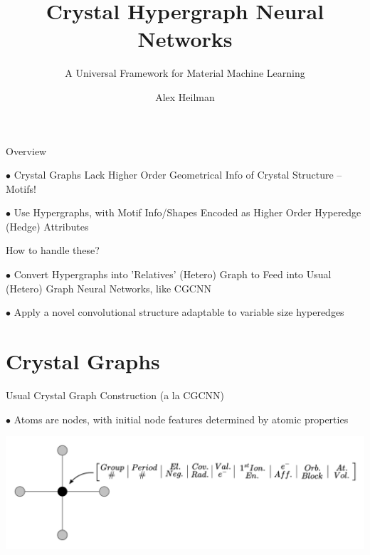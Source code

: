 \documentclass[11pt]{beamer}
\author{Alex Heilman}
\title{Crystal Hypergraph Neural Networks}
\subtitle{A Universal Framework for Material Machine Learning}
\begin{document}
\begin{frame}
\titlepage
\end{frame}


\begin{frame}{Overview}

$\bullet$ Crystal Graphs Lack Higher Order Geometrical Info of Crystal Structure \pause -- Motifs!

\vspace{.7cm}\pause

$\bullet$ Use Hypergraphs, with Motif Info/Shapes Encoded as Higher Order Hyperedge (Hedge) Attributes

\vspace{.7cm}\pause

How to handle these?\pause

\medskip\pause

$\bullet$ Convert Hypergraphs into 'Relatives' (Hetero) Graph  to Feed into Usual (Hetero) Graph Neural Networks, like CGCNN

\medskip\pause

$\bullet$ Apply a novel convolutional structure adaptable to variable size hyperedges


\end{frame}

\section{Crystal Graphs}
\begin{frame}{Usual Crystal Graph Construction \small(a la CGCNN)}

$\bullet$ Atoms are nodes, with initial node features determined by atomic properties

\medskip

\begin{center}

\includegraphics[scale=0.3]{atom_feat.pdf}

\end{center}
\end{frame}
\end{document}
